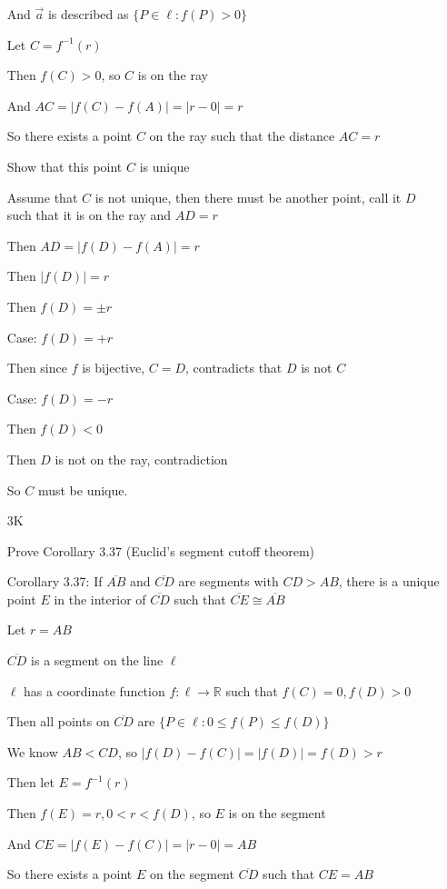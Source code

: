 \documentclass[11pt]{article}
\begin{document}
\begin{itemize}
		And $\overrightarrow{a}$ is described as $\{P\in\ell : f(P) > 0\}$

		Let $C = f^{-1}(r)$

		Then $f(C) > 0$, so $C$ is on the ray

		And $AC = |f(C) - f(A)| = |r - 0| = r$

		So there exists a point $C$ on the ray such that the distance $AC = r$

		Show that this point $C$ is unique

		Assume that $C$ is not unique, then there must be another point, call it $D$ such that it is on the ray and $AD = r$

		Then $AD = |f(D) - f(A)| = r$

		Then $|f(D)| = r$

		Then $f(D) = \pm r$

		Case: $f(D) = +r$

		Then since $f$ is bijective, $C = D$, contradicts that $D$ is not $C$
		
		Case: $f(D) = -r$

		Then $f(D) < 0$

		Then $D$ is not on the ray, contradiction

		So $C$ must be unique.

	\item[3K]

		Prove Corollary 3.37 (Euclid's segment cutoff theorem)

		Corollary 3.37: If $\overline{AB}$ and $\overline{CD}$ are segments with $CD>AB$, there is a unique point $E$ in the interior of $\overline{CD}$ such that $\overline{CE} \cong \overline{AB}$

		Let $r = AB$

		$\overline{CD}$ is a segment on the line $\ell$

		$\ell$ has a coordinate function $f:\ell \rightarrow \mathbb{R}$ such that $f(C) = 0, f(D) > 0$

		Then all points on $\overline{CD}$ are $\{P\in\ell : 0 \leq f(P) \leq f(D)\}$

		We know $AB < CD$, so $|f(D) - f(C)| = |f(D)| = f(D) > r$

		Then let $E = f^{-1}(r)$

		Then $f(E) = r, 0 < r < f(D)$, so $E$ is on the segment

		And $CE = |f(E) - f(C)| = |r - 0| = AB$

		So there exists a point $E$ on the segment $\overline{CD}$ such that $CE = AB$


\end{itemize}
\end{document}
